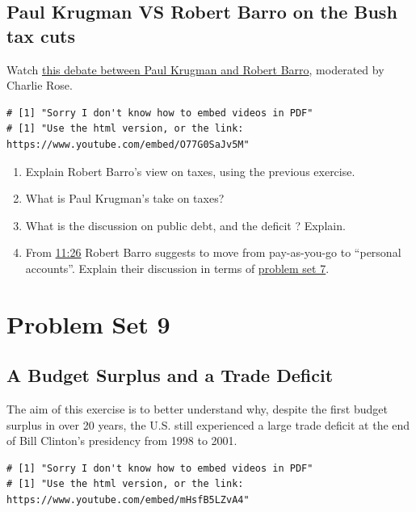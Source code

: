 \documentclass[]{book}
\begin{document}
\section{Paul Krugman VS Robert Barro on the Bush tax
cuts}\label{paul-krugman-vs-robert-barro-on-the-bush-tax-cuts}

Watch \href{https://www.youtube.com/watch?v=O77G0SaJv5M}{this debate
between Paul Krugman and Robert Barro}, moderated by Charlie Rose.

\begin{verbatim}
# [1] "Sorry I don't know how to embed videos in PDF"
# [1] "Use the html version, or the link: https://www.youtube.com/embed/O77G0SaJv5M"
\end{verbatim}

\begin{enumerate}
\def\labelenumi{\arabic{enumi}.}
\item
  Explain Robert Barro's view on taxes, using the previous exercise.
\item
  What is Paul Krugman's take on taxes?
\item
  What is the discussion on public debt, and the deficit ? Explain.
\item
  From \href{https://youtu.be/O77G0SaJv5M?t=686}{11:26} Robert Barro
  suggests to move from pay-as-you-go to ``personal accounts''. Explain
  their discussion in terms of \protect\hyperlink{pset7}{problem set 7}.
\end{enumerate}

\chapter{Problem Set 9}\label{pset9}

\section{A Budget Surplus and a Trade
Deficit}\label{a-budget-surplus-and-a-trade-deficit-1}

The aim of this exercise is to better understand why, despite the first
budget surplus in over 20 years, the U.S. still experienced a large
trade deficit at the end of Bill Clinton's presidency from 1998 to 2001.

\begin{verbatim}
# [1] "Sorry I don't know how to embed videos in PDF"
# [1] "Use the html version, or the link: https://www.youtube.com/embed/mHsfB5LZvA4"
\end{verbatim}
\end{document}
